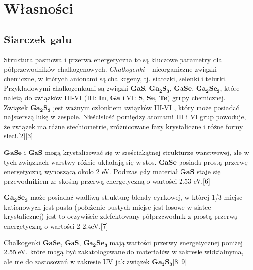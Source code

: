 \newpage

\section{Własności}

\subsection{Siarczek galu}
Struktura pasmowa i przerwa energetyczna to są kluczowe parametry dla półprzewodników chalkogenowych. \textit{Chalkogenki} – nieorganiczne związki chemiczne, w których anionami są chalkogeny, tj. siarczki, selenki i telurki. Przykładowymi chalkogenkami są związki $\mathbf{GaS}$, $\mathbf{Ga_{2}S_{3}}$, $\mathbf{GaSe}$, $\mathbf{Ga_{2}Se_{3}}$, które należą do związków III-VI (III: \textbf{In}, \textbf{Ga} i VI: \textbf{S}, \textbf{Se}, \textbf{Te}) grupy chemicznej. Związek $\mathbf{Ga_{2}S_{3}}$ jest ważnym członkiem związków III-VI , który może posiadać najszerszą lukę w zespole. Nieścisłość pomiędzy atomami III i VI grup powoduje, że związek ma różne stechiometrie, zróżnicowane fazy krystaliczne i różne formy sieci.[2][3]

$\mathbf{GaSe}$ i $\mathbf{GaS}$ mogą krystalizować się w sześciakątnej strukturze warstwowej, ale w tych związkach warstwy różnie układają się w stos. $\mathbf{GaSe}$ posiada prostą przerwę energetyczną wynoszącą około 2 eV. Podczas gdy materiał $\mathbf{GaS}$ staje się przewodnikiem ze skośną przerwą energetyczną o wartości 2.53 eV.[6]

$\mathbf{Ga_{2}Se_{3}}$ może posiadać wadliwą strukturę blendy cynkowej, w której 1/3 miejsc kationowych jest pusta (położenie pustych miejsc jest losowe w siatce krystalicznej) jest to oczywiście zdefektowany półprzewodnik z prostą przerwą energetyczną o wartości 2-2.4eV.[7]

Chalkogenki $\mathbf{GaSe}$, $\mathbf{GaS}$, $\mathbf{Ga_{2}Se_{3}}$ mają wartości przerwy energetycznej poniżej 2.55 eV. które mogą być zakatologowane do materiałów w zakresie widzialnyma, ale nie do zastosowań w zakresie UV jak związek $\mathbf{Ga_{2}S_{3}}$[8][9]

